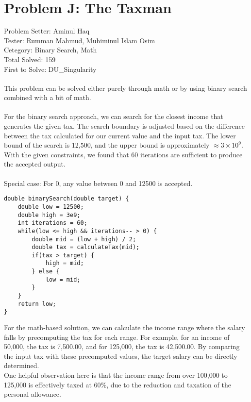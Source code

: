 \section*{Problem J: The Taxman}
Problem Setter: Aminul Haq \\
Tester: Rumman Mahmud,  Muhiminul Islam Osim \\
Cetegory: Binary Search, Math \\
Total Solved: 159 \\
First to Solve: DU\_Singularity \\
\\
This problem can be solved either purely through math or by using binary search combined with a bit of math. \\
\\
For the binary search approach, we can search for the closest income that generates the given tax. 
The search boundary is adjusted based on the difference between the tax calculated for our current value and the input tax. 
The lower bound of the search is 12,500, and the upper bound is approximately \(\approx 3 \times 10^9\). With the given constraints, we found that 60 iterations are sufficient to produce the accepted output.\\
\\
Special case: For 0, any value between 0 and 12500 is accepted.
\begin{verbatim}
double binarySearch(double target) {
    double low = 12500;
    double high = 3e9;
    int iterations = 60;
    while(low <= high && iterations-- > 0) {
        double mid = (low + high) / 2;
        double tax = calculateTax(mid);
        if(tax > target) {
            high = mid;
        } else {
            low = mid;
        }
    }
    return low;
}
\end{verbatim}

For the math-based solution, we can calculate the income range where the salary falls by precomputing the tax for each range. For example, for an income of 50,000, the tax is 7,500.00, and for 125,000, the tax is 42,500.00. By comparing the input tax with these precomputed values, the target salary can be directly determined.\\
One helpful observation here is that the income range from over 100,000 to 125,000 is effectively taxed at 60\%, due to the reduction and taxation of the personal allowance.\\
\\
